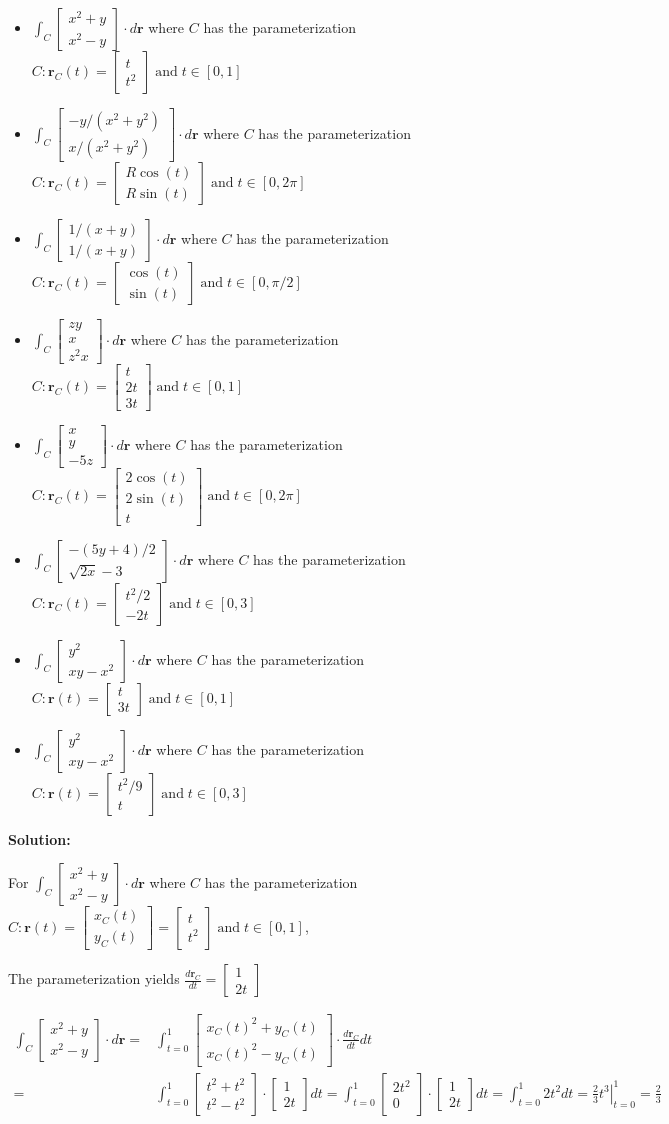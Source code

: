 \documentclass{article}
\newcommand{\colxyvec}[2]{\begin{bmatrix} #1 \\ #2 \end{bmatrix}}
\newcommand{\colvec}[3]{\begin{bmatrix} #1 \\ #2 \\ #3 \end{bmatrix}}
\newcommand{\at}[1]{\left. #1 \right|}
\newcommand{\dr}[1]{\textcolor{dark_red}{#1}}
\begin{document}
\begin{itemize}
\item \(\int_C \colxyvec{x^2 + y}{x^2 - y} \cdot d\mathbf{r}\) where \(C\) has the parameterization \(C: \mathbf{r}_C(t) = \colxyvec{t}{t^2} \;\text{and}\; t \in [0,1]\) 
\item \(\int_C \colxyvec{-y/(x^2 + y^2)}{x/(x^2 + y^2)} \cdot d\mathbf{r}\) where \(C\) has the parameterization \(C: \mathbf{r}_C(t) = \colxyvec{R\cos(t)}{R\sin(t)} \;\text{and}\; t \in [0, 2\pi]\) 
\item \(\int_C \colxyvec{1/(x+y)}{1/(x+y)} \cdot d\mathbf{r}\) where \(C\) has the parameterization \(C: \mathbf{r}_C(t) = \colxyvec{\cos(t)}{\sin(t)} \;\text{and}\; t \in [0,\pi/2]\)
\item \(\int_C \colvec{zy}{x}{z^2x} \cdot d\mathbf{r}\) where \(C\) has the parameterization \(C: \mathbf{r}_C(t) = \colvec{t}{2t}{3t} \;\text{and}\; t \in [0,1]\)
\item \(\int_C \colvec{x}{y}{-5z} \cdot d\mathbf{r}\) where \(C\) has the parameterization \(C: \mathbf{r}_C(t) = \colvec{2\cos(t)}{2\sin(t)}{t} \;\text{and}\; t \in [0,2\pi]\)
\item \(\int_C \colxyvec{-(5y + 4)/2}{\sqrt{2x} - 3} \cdot d\mathbf{r}\) where \(C\) has the parameterization \(C: \mathbf{r}_C(t) = \colxyvec{t^2 / 2}{-2t} \;\text{and}\; t \in [0,3]\)
\item \(\int_C \colxyvec{y^2}{xy - x^2} \cdot d\mathbf{r}\) where \(C\) has the parameterization \(C: \mathbf{r}(t) = \colxyvec{t}{3t} \;\text{and}\; t \in [0,1]\)
\item \(\int_C \colxyvec{y^2}{xy - x^2} \cdot d\mathbf{r}\) where \(C\) has the parameterization \(C: \mathbf{r}(t) = \colxyvec{t^2/9}{t} \;\text{and}\; t \in [0,3]\)
\end{itemize}

\pagebreak

\dr{\textbf{Solution:}}

\begin{framed} 
\dr{For \(\int_C \colxyvec{x^2 + y}{x^2 - y} \cdot d\mathbf{r}\) where \(C\) has the parameterization \(C: \mathbf{r}(t) = \colxyvec{x_C(t)}{y_C(t)} = \colxyvec{t}{t^2} \;\text{and}\; t \in [0,1]\),}

\dr{The parameterization yields \(\frac{d\mathbf{r}_C}{dt} = \colxyvec{1}{2t}\)}

\dr{\begin{align*}
\int_C \colxyvec{x^2 + y}{x^2 - y} \cdot d\mathbf{r} = & \int_{t = 0}^1 \colxyvec{x_C(t)^2 + y_C(t)}{x_C(t)^2 - y_C(t)} \cdot \frac{d\mathbf{r}_C}{dt}dt \\
= & \int_{t = 0}^1 \colxyvec{t^2 + t^2}{t^2 - t^2} \cdot \colxyvec{1}{2t}dt 
= \int_{t = 0}^1 \colxyvec{2t^2}{0} \cdot \colxyvec{1}{2t}dt 
= \int_{t = 0}^1 2t^2 dt 
= \at{\frac{2}{3}t^3}_{t=0}^1  
= \frac{2}{3}
\end{align*}}
\end{framed}
\end{document}
